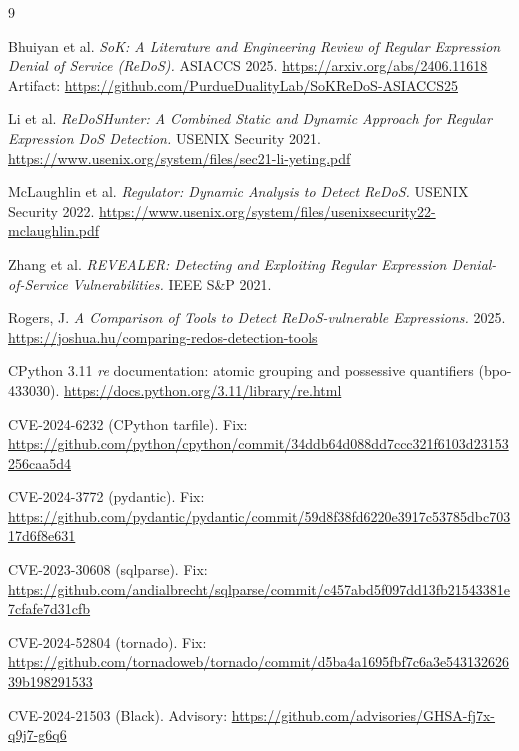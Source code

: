 \documentclass[11pt,a4paper]{article}
\begin{document}
\begin{thebibliography}{9}

 Bhuiyan et al. \textit{SoK: A Literature and Engineering Review of Regular Expression Denial of Service (ReDoS).} ASIACCS 2025. \url{https://arxiv.org/abs/2406.11618} Artifact: \url{https://github.com/PurdueDualityLab/SoKReDoS-ASIACCS25}

 Li et al. \textit{ReDoSHunter: A Combined Static and Dynamic Approach for Regular Expression DoS Detection.} USENIX Security 2021. \url{https://www.usenix.org/system/files/sec21-li-yeting.pdf}

 McLaughlin et al. \textit{Regulator: Dynamic Analysis to Detect ReDoS.} USENIX Security 2022. \url{https://www.usenix.org/system/files/usenixsecurity22-mclaughlin.pdf}

 Zhang et al. \textit{REVEALER: Detecting and Exploiting Regular Expression Denial-of-Service Vulnerabilities.} IEEE S\&P 2021.

 Rogers, J. \textit{A Comparison of Tools to Detect ReDoS-vulnerable Expressions.} 2025. \url{https://joshua.hu/comparing-redos-detection-tools}

 CPython 3.11 \textit{re} documentation: atomic grouping and possessive quantifiers (bpo-433030). \url{https://docs.python.org/3.11/library/re.html}

 CVE-2024-6232 (CPython tarfile). Fix: \url{https://github.com/python/cpython/commit/34ddb64d088dd7ccc321f6103d23153256caa5d4}

 CVE-2024-3772 (pydantic). Fix: \url{https://github.com/pydantic/pydantic/commit/59d8f38fd6220e3917c53785dbc70317d6f8e631}

 CVE-2023-30608 (sqlparse). Fix: \url{https://github.com/andialbrecht/sqlparse/commit/c457abd5f097dd13fb21543381e7cfafe7d31cfb}

 CVE-2024-52804 (tornado). Fix: \url{https://github.com/tornadoweb/tornado/commit/d5ba4a1695fbf7c6a3e54313262639b198291533}

 CVE-2024-21503 (Black). Advisory: \url{https://github.com/advisories/GHSA-fj7x-q9j7-g6q6}

\end{thebibliography}
\end{document}
